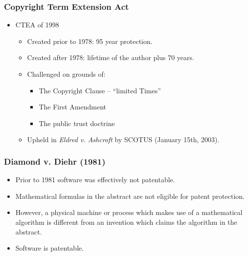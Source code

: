 \documentclass{beamer}
\begin{document}
\begin{frame}[t]
    \frametitle{Copyright Term Extension Act}
  \begin{itemize}
    \item<+-> CTEA of 1998
      \begin{itemize}
        \item<+-> Created prior to 1978: 95 year protection.
        \item<+-> Created after 1978: lifetime of the author plus 70 years.
        \item<+-> Challenged on grounds of:
        \begin{itemize}
            \item<+-> The Copyright Clause -- ``limited Times''
            \item<+-> The First Amendment
            \item<+-> The public trust doctrine
        \end{itemize}
        \item<+-> Upheld in \emph{Eldred v. Ashcroft} by SCOTUS (January 15th, 2003).
    \end{itemize}
  \end{itemize}
\end{frame}

\begin{frame}[t]
 \frametitle{Diamond v. Diehr (1981)}
 \begin{itemize}
     \item<+-> Prior to 1981 software was effectively not patentable.
     \item<+-> Mathematical formulas in the abstract are not eligible for patent protection.
     \item<+-> However, a physical machine or process which makes use of a mathematical algorithm is different from an invention which claims the algorithm in the abstract.
     \item<+-> Software is patentable.
 \end{itemize}
\end{frame}
\end{document}
